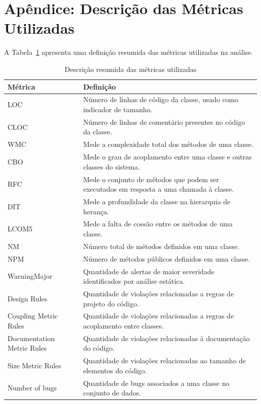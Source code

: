 \documentclass[12pt]{article}
\begin{document}
\section{Apêndice: Descrição das Métricas Utilizadas}
A Tabela~\ref{tab:metricas} apresenta uma definição resumida das métricas utilizadas na análise.
\begin{table}[H]
\centering
\caption{Descrição resumida das métricas utilizadas}
\label{tab:metricas}
\small
\begin{tabular}{p{} p{}}
\toprule
\textbf{Métrica} & \textbf{Definição} \\
\midrule
LOC & Número de linhas de código da classe, usado como indicador de tamanho. \\
CLOC & Número de linhas de comentário presentes no código da classe. \\
WMC & Mede a complexidade total dos métodos de uma classe. \\
CBO & Mede o grau de acoplamento entre uma classe e outras classes do sistema. \\
RFC & Mede o conjunto de métodos que podem ser executados em resposta a uma chamada à classe. \\
DIT & Mede a profundidade da classe na hierarquia de herança. \\
LCOM5 & Mede a falta de coesão entre os métodos de uma classe. \\
NM & Número total de métodos definidos em uma classe. \\
NPM & Número de métodos públicos definidos em uma classe. \\
WarningMajor & Quantidade de alertas de maior severidade identificados por análise estática. \\
Design Rules & Quantidade de violações relacionadas a regras de projeto do código. \\
Coupling Metric Rules & Quantidade de violações relacionadas a regras de acoplamento entre classes. \\
Documentation Metric Rules & Quantidade de violações relacionadas à documentação do código. \\
Size Metric Rules & Quantidade de violações relacionadas ao tamanho de elementos do código. \\
Number of bugs & Quantidade de bugs associados a uma classe no conjunto de dados. \\
\bottomrule
\end{tabular}
\end{table}
\end{document}
